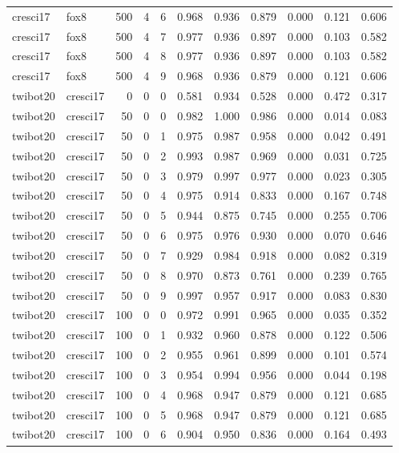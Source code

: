 \begin{tabular}{llrrrrrrrrr}
cresci17 & fox8 & 500 & 4 & 6 & 0.968 & 0.936 & 0.879 & 0.000 & 0.121 & 0.606 \\
cresci17 & fox8 & 500 & 4 & 7 & 0.977 & 0.936 & 0.897 & 0.000 & 0.103 & 0.582 \\
cresci17 & fox8 & 500 & 4 & 8 & 0.977 & 0.936 & 0.897 & 0.000 & 0.103 & 0.582 \\
cresci17 & fox8 & 500 & 4 & 9 & 0.968 & 0.936 & 0.879 & 0.000 & 0.121 & 0.606 \\
twibot20 & cresci17 & 0 & 0 & 0 & 0.581 & 0.934 & 0.528 & 0.000 & 0.472 & 0.317 \\
twibot20 & cresci17 & 50 & 0 & 0 & 0.982 & 1.000 & 0.986 & 0.000 & 0.014 & 0.083 \\
twibot20 & cresci17 & 50 & 0 & 1 & 0.975 & 0.987 & 0.958 & 0.000 & 0.042 & 0.491 \\
twibot20 & cresci17 & 50 & 0 & 2 & 0.993 & 0.987 & 0.969 & 0.000 & 0.031 & 0.725 \\
twibot20 & cresci17 & 50 & 0 & 3 & 0.979 & 0.997 & 0.977 & 0.000 & 0.023 & 0.305 \\
twibot20 & cresci17 & 50 & 0 & 4 & 0.975 & 0.914 & 0.833 & 0.000 & 0.167 & 0.748 \\
twibot20 & cresci17 & 50 & 0 & 5 & 0.944 & 0.875 & 0.745 & 0.000 & 0.255 & 0.706 \\
twibot20 & cresci17 & 50 & 0 & 6 & 0.975 & 0.976 & 0.930 & 0.000 & 0.070 & 0.646 \\
twibot20 & cresci17 & 50 & 0 & 7 & 0.929 & 0.984 & 0.918 & 0.000 & 0.082 & 0.319 \\
twibot20 & cresci17 & 50 & 0 & 8 & 0.970 & 0.873 & 0.761 & 0.000 & 0.239 & 0.765 \\
twibot20 & cresci17 & 50 & 0 & 9 & 0.997 & 0.957 & 0.917 & 0.000 & 0.083 & 0.830 \\
twibot20 & cresci17 & 100 & 0 & 0 & 0.972 & 0.991 & 0.965 & 0.000 & 0.035 & 0.352 \\
twibot20 & cresci17 & 100 & 0 & 1 & 0.932 & 0.960 & 0.878 & 0.000 & 0.122 & 0.506 \\
twibot20 & cresci17 & 100 & 0 & 2 & 0.955 & 0.961 & 0.899 & 0.000 & 0.101 & 0.574 \\
twibot20 & cresci17 & 100 & 0 & 3 & 0.954 & 0.994 & 0.956 & 0.000 & 0.044 & 0.198 \\
twibot20 & cresci17 & 100 & 0 & 4 & 0.968 & 0.947 & 0.879 & 0.000 & 0.121 & 0.685 \\
twibot20 & cresci17 & 100 & 0 & 5 & 0.968 & 0.947 & 0.879 & 0.000 & 0.121 & 0.685 \\
twibot20 & cresci17 & 100 & 0 & 6 & 0.904 & 0.950 & 0.836 & 0.000 & 0.164 & 0.493 \\

\end{tabular}
